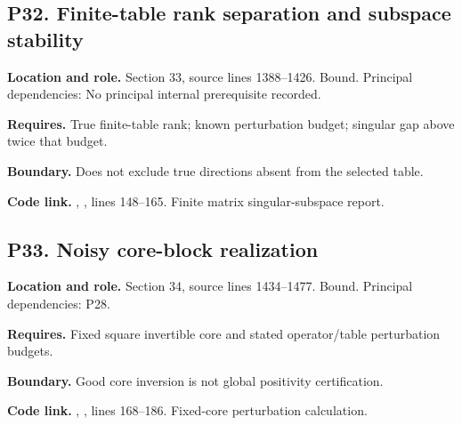 \documentclass[11pt,letterpaper]{article}
\begin{document}
\par\noindent\begin{minipage}{\textwidth}
\subsection{P32. Finite-table rank separation and subspace
stability}\label{p32.-finite-table-rank-separation-and-subspace-stability}

\textbf{Location and role.} Section 33, source lines 1388--1426. Bound.
Principal dependencies: No principal internal prerequisite recorded.

\textbf{Requires.} True finite-table rank; known perturbation budget;
singular gap above twice that budget.

\textbf{Boundary.} Does not exclude true directions absent from the
selected table.

\textbf{Code link.} ,
, lines 148--165. Finite matrix
singular-subspace report.
\end{minipage}\par\medskip

\par\noindent\begin{minipage}{\textwidth}
\subsection{P33. Noisy core-block
realization}\label{p33.-noisy-core-block-realization}

\textbf{Location and role.} Section 34, source lines 1434--1477. Bound.
Principal dependencies: P28.

\textbf{Requires.} Fixed square invertible core and stated
operator/table perturbation budgets.

\textbf{Boundary.} Good core inversion is not global positivity
certification.

\textbf{Code link.} ,
, lines 168--186. Fixed-core perturbation
calculation.
\end{minipage}\par\medskip
\end{document}
